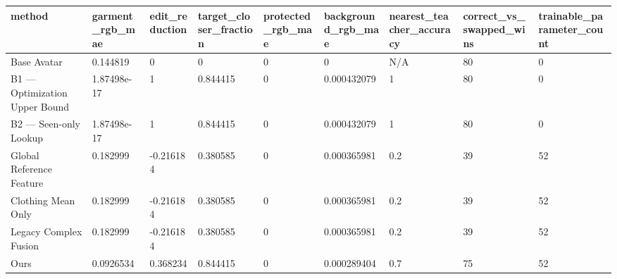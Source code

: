 \begin{tabular}{lllllllll}
method & garment_rgb_mae & edit_reduction & target_closer_fraction & protected_rgb_mae & background_rgb_mae & nearest_teacher_accuracy & correct_vs_swapped_wins & trainable_parameter_count \\
\hline
Base Avatar & 0.144819 & 0 & 0 & 0 & 0 & N/A & 80 & 0 \\
B1 — Optimization Upper Bound & 1.87498e-17 & 1 & 0.844415 & 0 & 0.000432079 & 1 & 80 & 0 \\
B2 — Seen-only Lookup & 1.87498e-17 & 1 & 0.844415 & 0 & 0.000432079 & 1 & 80 & 0 \\
Global Reference Feature & 0.182999 & -0.216184 & 0.380585 & 0 & 0.000365981 & 0.2 & 39 & 52 \\
Clothing Mean Only & 0.182999 & -0.216184 & 0.380585 & 0 & 0.000365981 & 0.2 & 39 & 52 \\
Legacy Complex Fusion & 0.182999 & -0.216184 & 0.380585 & 0 & 0.000365981 & 0.2 & 39 & 52 \\
Ours & 0.0926534 & 0.368234 & 0.844415 & 0 & 0.000289404 & 0.7 & 75 & 52 \\
\end{tabular}
